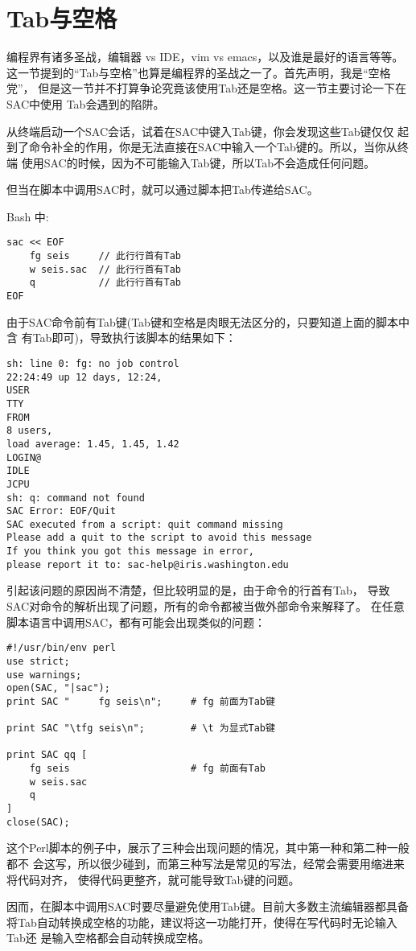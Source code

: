\section{Tab与空格}
编程界有诸多圣战，编辑器 vs IDE，vim vs emacs，以及谁是最好的语言等等。
这一节提到的``Tab与空格''也算是编程界的圣战之一了。首先声明，我是``空格党''，
但是这一节并不打算争论究竟该使用Tab还是空格。这一节主要讨论一下在SAC中使用
Tab会遇到的陷阱。

从终端启动一个SAC会话，试着在SAC中键入Tab键，你会发现这些Tab键仅仅
起到了命令补全的作用，你是无法直接在SAC中输入一个Tab键的。所以，当你从终端
使用SAC的时候，因为不可能输入Tab键，所以Tab不会造成任何问题。

但当在脚本中调用SAC时，就可以通过脚本把Tab传递给SAC。

Bash 中:
\begin{verbatim}
sac << EOF
    fg seis     // 此行行首有Tab
    w seis.sac  // 此行行首有Tab
    q           // 此行行首有Tab
EOF
\end{verbatim}
由于SAC命令前有Tab键(Tab键和空格是肉眼无法区分的，只要知道上面的脚本中含
有Tab即可)，导致执行该脚本的结果如下：
\begin{verbatim}
sh: line 0: fg: no job control
22:24:49 up 12 days, 12:24,
USER
TTY
FROM
8 users,
load average: 1.45, 1.45, 1.42
LOGIN@
IDLE
JCPU
sh: q: command not found
SAC Error: EOF/Quit
SAC executed from a script: quit command missing
Please add a quit to the script to avoid this message
If you think you got this message in error,
please report it to: sac-help@iris.washington.edu
\end{verbatim}

引起该问题的原因尚不清楚，但比较明显的是，由于命令的行首有Tab，
导致SAC对命令的解析出现了问题，所有的命令都被当做外部命令来解释了。
在任意脚本语言中调用SAC，都有可能会出现类似的问题：
\begin{verbatim}
#!/usr/bin/env perl
use strict;
use warnings;
open(SAC, "|sac");
print SAC "     fg seis\n";     # fg 前面为Tab键

print SAC "\tfg seis\n";        # \t 为显式Tab键

print SAC qq [
    fg seis                     # fg 前面有Tab
    w seis.sac
    q
]
close(SAC);
\end{verbatim}
这个Perl脚本的例子中，展示了三种会出现问题的情况，其中第一种和第二种一般都不
会这写，所以很少碰到，而第三种写法是常见的写法，经常会需要用缩进来将代码对齐，
使得代码更整齐，就可能导致Tab键的问题。

因而，在脚本中调用SAC时要尽量避免使用Tab键。目前大多数主流编辑器都具备
将Tab自动转换成空格的功能，建议将这一功能打开，使得在写代码时无论输入Tab还
是输入空格都会自动转换成空格。
